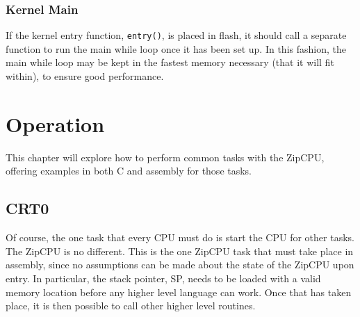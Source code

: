 \documentclass{gqtekspec}
\begin{document}
\subsection{Kernel Main}

If the kernel entry function, {\tt entry()}, is placed in flash, it should call
a separate function to run the main while loop once it has been set up.  In
this fashion, the main while loop may be kept in the fastest memory necessary
(that it will fit within), to ensure good performance.

\chapter{Operation}\label{chap:ops}

This chapter will explore how to perform common tasks with the ZipCPU,
offering examples in both C and assembly for those tasks.

\section{CRT0}

Of course, the one task that every CPU must do is start the CPU for other
tasks.  The ZipCPU is no different.  This is the one ZipCPU task that must
take place in assembly, since no assumptions can be made about the state of
the ZipCPU upon entry.  In particular, the stack pointer, SP, needs to be
loaded with a valid memory location before any higher level language can work.
Once that has taken place, it is then possible to call other higher level
routines.
\end{document}
